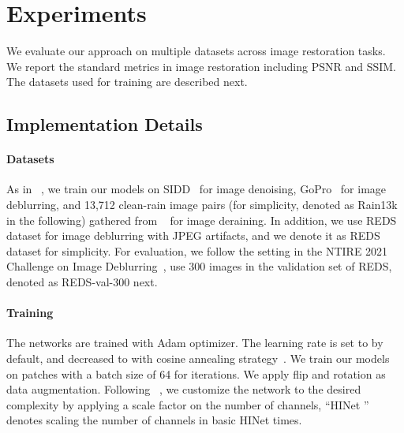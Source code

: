 \documentclass[final]{cvpr}
\begin{document}
\section{Experiments}
We evaluate our approach on multiple datasets across image restoration tasks. We report the standard metrics in image restoration including PSNR and SSIM. The datasets used for training are described next.
\subsection{Implementation Details}
\paragraph{Datasets}
As in ~\cite{Zamir2021MPRNet}, we train our models on SIDD~\cite{abdelhamed2018high} for image denoising, GoPro~\cite{nah2017deep} for image deblurring, and 13,712 clean-rain image pairs (for simplicity, denoted as Rain13k in the following) gathered from ~\cite{fu2017removing,li2016rain,yang2017deep,zhang2018density,zhang2019image} for image deraining. In addition, we use REDS~\cite{nah2019ntire} dataset for image deblurring with JPEG artifacts, and we denote it as REDS dataset for simplicity. For evaluation, we follow the setting in the NTIRE 2021 Challenge on Image Deblurring~\cite{nah2021ntire}, \ie use 300 images in the validation set of REDS, denoted as REDS-val-300 next. 


\paragraph{Training}
The networks are trained with Adam optimizer. The learning rate is set to  by default, and decreased to  with cosine annealing strategy~\cite{loshchilov2016sgdr}. We train our models on  patches with a batch size of 64 for  iterations. We apply flip and rotation as data augmentation.
Following ~\cite{zhang2018shufflenet}, we customize the network to the desired complexity by applying a scale factor  on the number of channels, \eg ``HINet '' denotes scaling the number of channels in basic HINet  times. 
\end{document}
